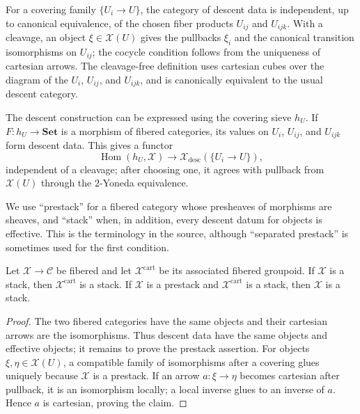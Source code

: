 \begin{remark}\label{fga-rem-4-3}
For a covering family $\{U_i\to U\}$, the category of descent data is independent,
up to canonical equivalence, of the chosen fiber products $U_{ij}$ and $U_{ijk}$.
With a cleavage, an object $\xi\in\mathcal X(U)$ gives the pullbacks $\xi_i$ and
the canonical transition isomorphisms on $U_{ij}$; the cocycle condition follows
from the uniqueness of cartesian arrows.  The cleavage-free definition uses
cartesian cubes over the diagram of the $U_i$, $U_{ij}$, and $U_{ijk}$, and is
canonically equivalent to the usual descent category.
\end{remark}

\begin{remark}\label{fga-rem-4-4}
The descent construction can be expressed using the covering sieve $h_U$.  If
$F:h_U\to\mathbf{Set}$ is a morphism of fibered categories, its values on
$U_i$, $U_{ij}$, and $U_{ijk}$ form descent data.  This gives a functor
\[
 \operatorname{Hom}(h_U,\mathcal X)\longrightarrow
 \mathcal X_{\mathrm{desc}}(\{U_i\to U\}),
\]
independent of a cleavage; after choosing one, it agrees with pullback from
$\mathcal X(U)$ through the $2$-Yoneda equivalence.
\end{remark}

\begin{remark}\label{fga-rem-4-10}
We use ``prestack'' for a fibered category whose presheaves of morphisms are
sheaves, and ``stack'' when, in addition, every descent datum for objects is
effective.  This is the terminology in the source, although ``separated
prestack'' is sometimes used for the first condition.
\end{remark}

\begin{proposition}\label{fga-pro-4-20}
Let $\mathcal X\to\mathcal C$ be fibered and let $\mathcal X^{\mathrm{cart}}$
be its associated fibered groupoid.  If $\mathcal X$ is a stack, then
$\mathcal X^{\mathrm{cart}}$ is a stack.  If $\mathcal X$ is a prestack and
$\mathcal X^{\mathrm{cart}}$ is a stack, then $\mathcal X$ is a stack.
\end{proposition}
\begin{proof}
The two fibered categories have the same objects and their cartesian arrows are
the isomorphisms.  Thus descent data have the same objects and effective objects;
it remains to prove the prestack assertion.  For objects $\xi,\eta\in
\mathcal X(U)$, a compatible family of isomorphisms after a covering glues
uniquely because $\mathcal X$ is a prestack.  If an arrow $a:\xi\to\eta$ becomes
cartesian after pullback, it is an isomorphism locally; a local inverse glues to
an inverse of $a$.  Hence $a$ is cartesian, proving the claim.
\end{proof}

